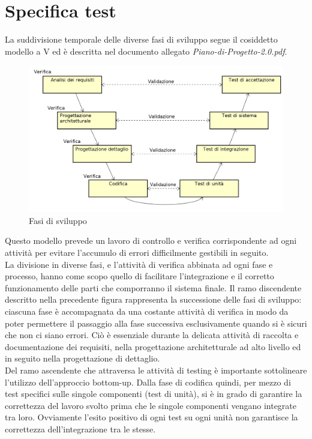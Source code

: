 \documentclass[a4paper,11pt]{article}
\begin{document}
\section{Specifica test}
\label{Appendice B} 
La suddivisione temporale delle diverse fasi di sviluppo segue il cosiddetto modello a V ed è descritta nel documento allegato \textit{Piano-di-Progetto-2.0.pdf}.
\begin{figure}[h!]
\centering
\includegraphics[scale=0.4]{../images/vmodel-final4.png}
\caption{Fasi di sviluppo}
\end{figure} 
Questo modello prevede un lavoro di controllo e verifica corrispondente ad ogni attività per evitare l'accumulo di errori difficilmente gestibili in seguito.\\
La divisione in diverse fasi, e l'attività di verifica abbinata ad ogni fase e processo, hanno come scopo quello di facilitare l'integrazione e il corretto funzionamento delle parti che comporranno il sistema finale.
Il ramo discendente descritto nella precedente figura rappresenta la successione delle fasi di sviluppo: ciascuna fase è accompagnata da una costante attività di verifica in modo da poter permettere il passaggio alla fase successiva esclusivamente quando si è sicuri che non ci siano errori. Ciò è essenziale durante la delicata attività di raccolta e documentazione dei requisiti, nella progettazione architetturale ad alto livello ed in seguito nella progettazione di dettaglio.\\ 
Del ramo ascendente che attraversa le attività di testing è importante sottolineare l'utilizzo dell'approccio bottom-up.
Dalla fase di codifica quindi, per mezzo di test specifici sulle singole componenti (test di unità), si è in grado di garantire la correttezza del lavoro svolto prima che le singole componenti vengano integrate tra loro. Ovviamente l'esito positivo di ogni test su ogni unità non garantisce la correttezza dell'integrazione tra le stesse. \\
\end{document}
